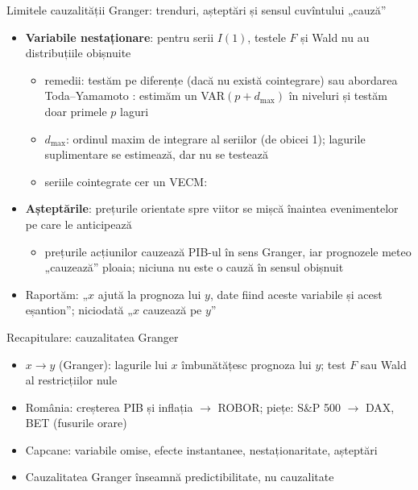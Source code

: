 \begin{frame}{Limitele cauzalității Granger: trenduri, așteptări și sensul cuvîntului „cauză”}
\itemsize{\small}
\begin{itemize}
    \item \textbf{Variabile nestaționare}: pentru serii $I(1)$, testele $F$ și Wald nu au distribuțiile obișnuite 
    \begin{itemize}
        \item remedii: testăm pe diferențe (dacă nu există cointegrare) sau abordarea Toda--Yamamoto : estimăm un VAR$(p + d_{\max})$ în niveluri și testăm doar primele $p$ laguri
        \item $d_{\max}$: ordinul maxim de integrare al seriilor (de obicei 1); lagurile suplimentare se estimează, dar nu se testează
        \item seriile cointegrate cer un VECM: 
    \end{itemize}
    \item \textbf{Așteptările}: prețurile orientate spre viitor se mișcă înaintea evenimentelor pe care le anticipează
    \begin{itemize}
        \item prețurile acțiunilor cauzează PIB-ul în sens Granger, iar prognozele meteo „cauzează” ploaia; niciuna nu este o cauză în sensul obișnuit
    \end{itemize}
    \item Raportăm: „$x$ ajută la prognoza lui $y$, date fiind aceste variabile și acest eșantion”; niciodată „$x$ cauzează pe $y$”
\end{itemize}
\end{frame}

\begin{frame}{Recapitulare: cauzalitatea Granger}
\itemsize{\small}
\begin{itemize}
    \item $x \to y$ (Granger): lagurile lui $x$ îmbunătățesc prognoza lui $y$; test $F$ sau Wald al restricțiilor nule
    \item România: creșterea PIB și inflația $\to$ ROBOR; piețe: S\&P 500 $\to$ DAX, BET (fusurile orare)
    \item Capcane: variabile omise, efecte instantanee, nestaționaritate, așteptări
    \item Cauzalitatea Granger înseamnă predictibilitate, nu cauzalitate
\end{itemize}
\end{frame}


